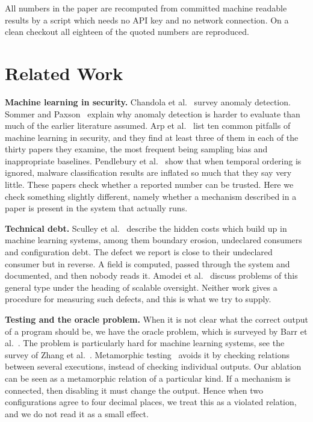 \documentclass[conference]{IEEEtran}
\begin{document}
All numbers in the paper are recomputed from committed machine readable results
by a script which needs no API key and no network connection. On a clean
checkout all eighteen of the quoted numbers are reproduced.

\section{Related Work}

\textbf{Machine learning in security.}
Chandola et al.~\cite{chandola2009} survey anomaly detection. Sommer and
Paxson~\cite{sommer2010} explain why anomaly detection is harder to evaluate
than much of the earlier literature assumed. Arp et al.~\cite{arp2022} list
ten common pitfalls of machine learning in security, and they find at least
three of them in each of the thirty papers they examine, the most frequent
being sampling bias and inappropriate baselines. Pendlebury et
al.~\cite{pendlebury2019} show that when temporal ordering is ignored, malware
classification results are inflated so much that they say very little. These
papers check whether a reported number can be trusted. Here we check something
slightly different, namely whether a mechanism described in a paper is present
in the system that actually runs.

\textbf{Technical debt.}
Sculley et al.~\cite{sculley2015} describe the hidden costs which build up in
machine learning systems, among them boundary erosion, undeclared consumers and
configuration debt. The defect we report is close to their undeclared consumer
but in reverse. A field is computed, passed through the system and documented,
and then nobody reads it. Amodei et al.~\cite{amodei2016} discuss problems of
this general type under the heading of scalable oversight. Neither work gives a
procedure for measuring such defects, and this is what we try to supply.

\textbf{Testing and the oracle problem.}
When it is not clear what the correct output of a program should be, we have
the oracle problem, which is surveyed by Barr et al.~\cite{barr2015}. The
problem is particularly hard for machine learning systems, see the survey of
Zhang et al.~\cite{zhang2022}. Metamorphic testing~\cite{chen2018metamorphic}
avoids it by checking relations between several executions, instead of
checking individual outputs. Our ablation can be seen as a metamorphic relation
of a particular kind. If a mechanism is connected, then disabling it must change
the output. Hence when two configurations agree to four decimal places, we
treat this as a violated relation, and we do not read it as a small effect.
\end{document}
